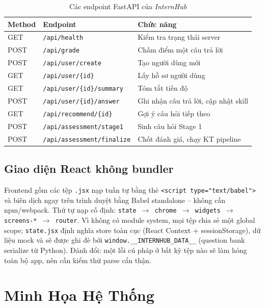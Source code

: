 \documentclass[12pt, a4paper]{report}
\newcommand{\system}{\textit{InternHub}}
\begin{document}
\begin{table}[H]
  \centering
  \caption{Các endpoint FastAPI của \system{}}
  \label{tab:endpoints}
  \begin{tabular}{lll}
    \toprule
    \textbf{Method} & \textbf{Endpoint} & \textbf{Chức năng} \\
    \midrule
    GET  & \texttt{/api/health}                 & Kiểm tra trạng thái server \\
    POST & \texttt{/api/grade}                  & Chấm điểm một câu trả lời \\
    POST & \texttt{/api/user/create}            & Tạo người dùng mới \\
    GET  & \texttt{/api/user/\{id\}}            & Lấy hồ sơ người dùng \\
    GET  & \texttt{/api/user/\{id\}/summary}    & Tóm tắt tiến độ \\
    POST & \texttt{/api/user/\{id\}/answer}     & Ghi nhận câu trả lời, cập nhật skill \\
    GET  & \texttt{/api/recommend/\{id\}}       & Gợi ý câu hỏi tiếp theo \\
    POST & \texttt{/api/assessment/stage1}      & Sinh câu hỏi Stage 1 \\
    POST & \texttt{/api/assessment/finalize}    & Chốt đánh giá, chạy KT pipeline \\
    \bottomrule
  \end{tabular}
\end{table}

\subsection{Giao diện React không bundler}
Frontend gồm các tệp \texttt{.jsx} nạp tuần tự bằng thẻ \texttt{<script type="text/babel">} và biên dịch ngay trên trình duyệt bằng Babel standalone -- không cần npm/webpack. Thứ tự nạp cố định: \texttt{state $\to$ chrome $\to$ widgets $\to$ screens-* $\to$ router}. Vì không có module system, mọi tệp chia sẻ một global scope; \texttt{state.jsx} định nghĩa store toàn cục (React Context + sessionStorage), dữ liệu mock và sẽ được ghi đè bởi \texttt{window.\_\_INTERNHUB\_DATA\_\_} (question bank serialize từ Python). Đánh đổi: một lỗi cú pháp ở bất kỳ tệp nào sẽ làm hỏng toàn bộ app, nên cần kiểm thử parse cẩn thận.

\section{Minh Họa Hệ Thống}
\label{sec:demo}
\end{document}

